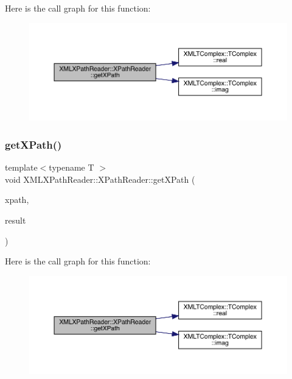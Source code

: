 Here is the call graph for this function\+:
\nopagebreak
\begin{figure}[H]
\begin{center}
\leavevmode
\includegraphics[width=350pt]{d3/d5a/classXMLXPathReader_1_1XPathReader_a82579390a7b37879a7a7d9b79934a592_cgraph}
\end{center}
\end{figure}
\mbox{\label{classXMLXPathReader_1_1XPathReader_a82579390a7b37879a7a7d9b79934a592}} 
\subsubsection{\texorpdfstring{getXPath()}{getXPath()}\hspace{0.1cm}{\footnotesize\ttfamily [5/9]}}
{\footnotesize\ttfamily template$<$typename T $>$ \\
void X\+M\+L\+X\+Path\+Reader\+::\+X\+Path\+Reader\+::get\+X\+Path (\begin{DoxyParamCaption}\item[{const std\+::string \&}]{xpath,  }\item[{\mbox{\hyperlink{classXMLTComplex_1_1TComplex}{X\+M\+L\+T\+Complex\+::\+T\+Complex}}$<$ T $>$ \&}]{result }\end{DoxyParamCaption})\hspace{0.3cm}{\ttfamily [inline]}}

Here is the call graph for this function\+:
\nopagebreak
\begin{figure}[H]
\begin{center}
\leavevmode
\includegraphics[width=350pt]{d3/d5a/classXMLXPathReader_1_1XPathReader_a82579390a7b37879a7a7d9b79934a592_cgraph}
\end{center}
\end{figure}
\mbox{\label{classXMLXPathReader_1_1XPathReader_a82579390a7b37879a7a7d9b79934a592}} 
